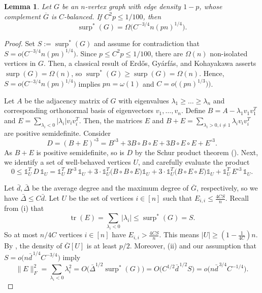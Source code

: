 \documentclass[11pt]{article}
\theoremstyle{plain}
\newtheorem{lemma}[theorem]{Lemma}
\theoremstyle{definition}
\DeclareMathOperator{\surp}{surp}
\DeclareMathOperator{\trace}{tr}
\begin{document}
\begin{lemma}
   Let $G$ be an $n$-vertex graph with edge density $1-p$, whose complement $\overline{G}$ is $C$-balanced. If $C^2p \le 1/100$, then 
        $$\surp^*(G) = \Omega\big(C^{-3/4}n(pn)^{1/4} \big).$$
\end{lemma}
\begin{proof}
    Set $S:= \surp^*(G)$ and assume for contradiction that $S= o\big(C^{-3/4}n(pn)^{1/4}\big)$.
    Since $p \le C^2p \le 1/100$, there are $\Omega(n)$ non-isolated vertices in $G$.
    Then, a classical result of Erd\H{o}s, Gy\'arf\'as, and Kohayakawa \cite{EGyK} asserts $\surp(G) = \Omega(n)$, so $\surp^*(G) \ge \surp(G) = \Omega(n)$.
    Hence, $S= o\big(C^{-3/4}n(pn)^{1/4}\big)$ implies $pn = \omega(1)$ and $C = o\big((pn)^{1/3})\big)$.
    
    Let $A$ be the adjacency matrix of $G$ with eigenvalues $\lambda_1\geq \dots\geq \lambda_n$ and corresponding orthonormal basis of eigenvectors $v_1,\dots,v_n$.
    Define $B=A-\lambda_1v_1v_1^T$ and $E=\sum_{\lambda_i<0}|\lambda_i| v_iv_i^T$. Then, the matrices $E$ and $B+E=\sum_{\lambda_i>0,i\neq 1}\lambda_i v_iv_i^T$ are positive semidefinite. Consider 
    $$D=(B+E)^{\circ 3}=B^{\circ 3}+3B\circ B\circ E+3B\circ E\circ E+E^{\circ 3}.$$
    As $B+E$ is positive semidefinite, so is $D$ by the Schur product theorem (). 
    Next, we identify a set of well-behaved vertices $U$, and carefully evaluate the product 
    \begin{equation} \label{eq: expansion of cut--hadamard}
        0 \leq \mathds{1}_U^T \,D\, \mathds{1}_U
        = \mathds{1}_U^T\,B^{\circ 3}\,\mathds{1}_U+ 3\cdot \mathds{1}_U^T\big(B\circ B\circ E\big)\mathds{1}_U + 3\cdot \mathds{1}_U^T\big(B\circ E\circ E\big)\mathds{1}_U + \mathds{1}_U^T \,E^{\circ 3}\, \mathds{1}_U.
    \end{equation}

    Let $\bar{d}, \bar{\Delta}$ be the average degree and the maximum degree of $\overline{G}$, respectively, so we have $\bar{\Delta} \le C\bar{d}$.
    Let $U$ be the set of vertices $i \in [n]$ such that $E_{i,i} \le \frac{4CS}{n}$.
    Recall from  (i) that $$ \trace(E)= \sum_{\lambda_i < 0} |\lambda_i| \le \surp^*(G)=S.$$
    So at most $n/4C$ vertices $i \in [n]$ have $E_{i,i} > \frac{4CS}{n}$. This means $|U| \ge (1-\frac{1}{4C})n$.
    By , the density of $\overline{G}[U]$ is at least $p/2$.
    Moreover,  (ii) and our assumption that $S=o\big(n\bar{d}^{\,1/4}C^{-3/4}\big)$ imply 
    \begin{equation} \label{eq: maxcut F-norm upper bound}
        \|E\|_F^2 = \sum_{\lambda_i < 0} \lambda_i^2
        = O\Big({\bar{\Delta}}^{1/2}\surp^*(G)\Big) 
        = O\big(C^{1/2}\bar{d}^{\,1/2} S\big)
        = o\big(n\bar{d}^{\,3/4}C^{-1/4}\big).
    \end{equation}
    

\end{proof}
\end{document}

